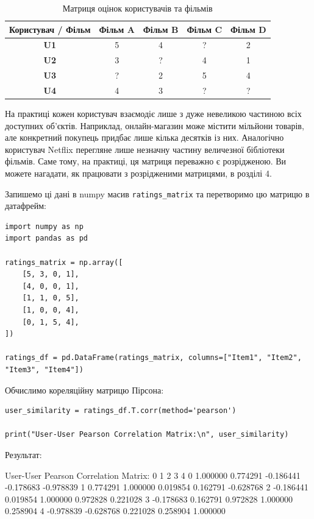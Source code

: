 \begin{table}[htbp]
\centering
\caption{Матриця оцінок користувачів та фільмів}
\label{tab:user_movie_ratings}
\begin{tabular}{ccccc}
\toprule
\textbf{Користувач / Фільм} & \textbf{Фільм A} & \textbf{Фільм B} & \textbf{Фільм C} & \textbf{Фільм D} \\ 
\midrule
\textbf{U1} & 5 & 4 & ? & 2 \\ 
\textbf{U2} & 3 & ? & 4 & 1 \\ 
\textbf{U3} & ? & 2 & 5 & 4 \\ 
\textbf{U4} & 4 & 3 & ? & ? \\ 
\bottomrule
\end{tabular}
\end{table}

На практиці кожен користувач взаємодіє лише з дуже невеликою частиною всіх доступних об'єктів. Наприклад, онлайн-магазин може містити мільйони товарів, але конкретний покупець придбає лише кілька десятків із них. Аналогічно користувач Netflix перегляне лише незначну частину величезної бібліотеки фільмів. Саме тому, на практиці, ця матриця переважно є розрідженою. Ви можете нагадати, як працювати з розрідженими матрицями, в розділі 4.

Запишемо ці дані в numpy масив \verb|ratings_matrix| та перетворимо цю матрицю в датафрейм:

\begin{lstlisting}
import numpy as np
import pandas as pd

ratings_matrix = np.array([
    [5, 3, 0, 1],
    [4, 0, 0, 1],
    [1, 1, 0, 5],
    [1, 0, 0, 4],
    [0, 1, 5, 4],
])

ratings_df = pd.DataFrame(ratings_matrix, columns=["Item1", "Item2", "Item3", "Item4"])
\end{lstlisting}

Обчислимо кореляційну матрицю Пірсона:

\begin{lstlisting}
user_similarity = ratings_df.T.corr(method='pearson')

print("User-User Pearson Correlation Matrix:\n", user_similarity)
\end{lstlisting}

Результат:

\begin{console}
User-User Pearson Correlation Matrix:
           0         1         2         3         4
0  1.000000  0.774291 -0.186441 -0.178683 -0.978839
1  0.774291  1.000000  0.019854  0.162791 -0.628768
2 -0.186441  0.019854  1.000000  0.972828  0.221028
3 -0.178683  0.162791  0.972828  1.000000  0.258904
4 -0.978839 -0.628768  0.221028  0.258904  1.000000
\end{console}


